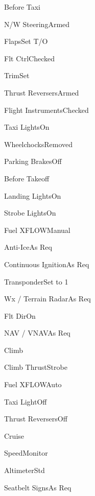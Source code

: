 \documentclass[sim-use]{checklist}
\begin{document}
\begin{checklist}{Before Taxi}
    \item{N/W Steering}{Armed}
    \item{Flaps}{Set T/O}
    \item{Flt Ctrl}{Checked}
    \item{Trim}{Set}
    \item{Thrust Reversers}{Armed}
    \item{Flight Instruments}{Checked}
    \item{Taxi Lights}{On}
    \item{Wheelchocks}{Removed}
    \item{Parking Brakes}{Off}
\end{checklist}

\begin{checklist}{Before Takeoff}
    \item{Landing Lights}{On}
    \item{Strobe Lights}{On}
    \item{Fuel XFLOW}{Manual}
    \item{Anti-Ice}{As Req}
    \item{Continuous Ignition}{As Req}
    \item{Transponder}{Set to 1}
    \item{Wx / Terrain Radar}{As Req}
    \item{Flt Dir}{On}
    \item{NAV / VNAV}{As Req}
\end{checklist}

\begin{checklist}{Climb}
    \item{Climb Thrust}{Strobe}
    \item{Fuel XFLOW}{Auto}
    \item{Taxi Light}{Off}
    \item{Thrust Reversers}{Off}
\end{checklist}

\begin{checklist}{Cruise}
    \item{Speed}{Monitor}
    \item{Altimeter}{Std}
    \item{Seatbelt Signs}{As Req}
\end{checklist}  
\end{document}
